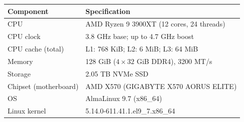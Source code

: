 \small
\renewcommand{\arraystretch}{1.15}
\begin{tabular}{@{}ll@{}}
\toprule
Component & Specification \\
\midrule
CPU & AMD Ryzen 9 3900XT (12 cores, 24 threads) \\
CPU clock & 3.8 GHz base; up to 4.7 GHz boost \\
CPU cache (total) & L1: 768 KiB; L2: 6 MiB; L3: 64 MiB \\
Memory & 128 GiB ($4 \times 32$ GiB DDR4), 3200 MT/s \\
Storage & 2.05 TB NVMe SSD \\
Chipset (motherboard) & AMD X570 (GIGABYTE X570 AORUS ELITE) \\
OS & AlmaLinux 9.7 (x86\_64) \\
Linux kernel & 5.14.0-611.41.1.el9\_7.x86\_64 \\
\bottomrule
\end{tabular}
